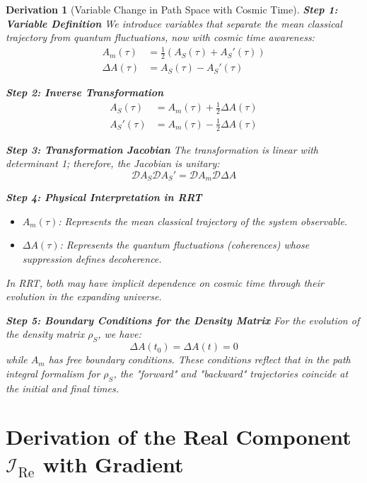 \documentclass[10pt, a4paper]{article}
\newtheorem{derivation}{Derivation}
\begin{document}
\begin{derivation}[Variable Change in Path Space with Cosmic Time]
\textbf{Step 1: Variable Definition}
We introduce variables that separate the mean classical trajectory from quantum fluctuations, now with cosmic time awareness:
\begin{align}
A_m(\tau) &= \frac{1}{2} (A_S(\tau) + A_S'(\tau))
\tag{19.1} \\
\Delta A(\tau) &= A_S(\tau) - A_S'(\tau)
\tag{19.2}
\end{align}

\textbf{Step 2: Inverse Transformation}
\begin{align}
A_S(\tau) &= A_m(\tau) + \frac{1}{2} \Delta A(\tau)
\tag{19.3} \\
A_S'(\tau) &= A_m(\tau) - \frac{1}{2} \Delta A(\tau)
\tag{19.4}
\end{align}

\textbf{Step 3: Transformation Jacobian}
The transformation is linear with determinant 1; therefore, the Jacobian is unitary:
\begin{equation}
\mathscr{D}A_S \mathscr{D}A_S' = \mathscr{D}A_m \mathscr{D}\Delta A
\tag{19.5}
\end{equation}

\textbf{Step 4: Physical Interpretation in RRT}
\begin{itemize}
\item $A_m(\tau)$: Represents the mean classical trajectory of the system observable.
\item $\Delta A(\tau)$: Represents the quantum fluctuations (coherences) whose suppression defines decoherence.
\end{itemize}
In RRT, both may have implicit dependence on cosmic time through their evolution in the expanding universe.

\textbf{Step 5: Boundary Conditions for the Density Matrix}
For the evolution of the density matrix $\rho_S$, we have:
\begin{equation}
\Delta A(t_0) = \Delta A(t) = 0
\tag{19.6}
\end{equation}
while $A_m$ has free boundary conditions. These conditions reflect that in the path integral formalism for $\rho_S$, the "forward" and "backward" trajectories coincide at the initial and final times.
\end{derivation}

\section{Derivation of the Real Component \texorpdfstring{$\mathcal{I}_{\text{Re}}$}{I\_Re} with Gradient}
\end{document}
